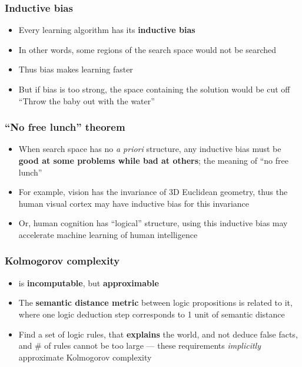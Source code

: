 \documentclass[17pt]{beamer}
\begin{document}
\begin{frame}
\frametitle{Inductive bias}
\begin{itemize}
	\item Every learning algorithm has its \textbf{inductive bias}
	\item In other words, some regions of the search space would not be searched
	\item Thus bias makes learning faster
	\item But if bias is too strong, the space containing the solution would be cut off \\
	``Throw the baby out with the water''
\end{itemize}
\end{frame}

\begin{frame}
\frametitle{``No free lunch'' theorem}
\fontsize{16}{15}\selectfont
\begin{itemize}
	\item When search space has no \textit{a priori} structure, any inductive bias must be {\color{red}\textbf{good at some problems while bad at others}};  the meaning of ``no free lunch''
	\item For example, vision has the invariance of 3D Euclidean geometry, thus the human visual cortex may have inductive bias for this invariance
	\item Or, human cognition has ``logical'' structure, using this inductive bias may accelerate machine learning of human intelligence
\end{itemize}
\end{frame}

\begin{frame}
\frametitle{Kolmogorov complexity}
\fontsize{16}{15}\selectfont
\begin{itemize}
	\item is {\color{red}\textbf{incomputable}}, but {\color{red}\textbf{approximable}}
	\item The {\color{red}\textbf{semantic distance metric}} between logic propositions is related to it, where one logic deduction step corresponds to 1 unit of semantic distance
	\item Find a set of logic rules, that \textbf{explains} the world, and not deduce false facts, and \# of rules cannot be too large --- these requirements \textit{implicitly} approximate Kolmogorov complexity
\end{itemize}
\end{frame}
\end{document}
